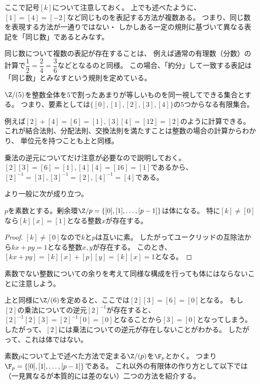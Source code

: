 \documentclass[uplatex]{jsarticle}
\begin{document}
ここで記号$[k]$について注意しておく。
上でも述べたように、$[1]=[4]=[-2]$など同じものを表記する方法が複数ある。
つまり、同じ数を表現する方法が一通りではない・
しかしある一定の規則に基づいて異なる表記を「同じ数」であるとみなす。

同じ数について複数の表記が存在することは、
例えば通常の有理数（分数）の計算で$\dfrac{1}{2}=\dfrac{2}{4}=\dfrac{3}{6}$などとなるのと同様。
この場合、「約分」して一致する表記は「同じ数」とみなすという規則を定めている。

\begin{eg}
  $\Z/(5)$を整数全体を$5$で割ったあまりが等しいものを同一視してできる集合とする。
  つまり、要素としては$\{[0],[1],[2],[3],[4]\}$の$5$つからなる有限集合。

  例えば$[2]+[4]=[6]=[1], [3][4]=[12]=[2]$のように計算できる。
  これが結合法則、分配法則、交換法則を満たすことは整数の場合の計算からわかり、
  単位元を持つことも上と同様。

  乗法の逆元についてだけ注意が必要なので説明しておく。
  $[2][3]=[6]=[1], [4][4]=[16]=[1]$であるから、$[2]^{-1}=[3], [3]^{-1}=[2], [4]^{-1}=[4]$である。
\end{eg}

より一般に次が成り立つ。
\begin{prop}
  $p$を素数とする。剰余環$\Z/p=\{[0],[1],\ldots,[p-1]\}$は体になる。
  特に$[k]\neq[0]$なら$[k][x]=[1]$となる整数$x$が存在する。
\end{prop}

\begin{proof}
  $[k]\neq[0]$なので$k$と$p$は互いに素。
  したがってユークリッドの互除法から$kx+py=1$となる整数$x,y$が存在する。
  このとき、$[kx+py]=[k][x]+[p][y]=[k][x]=1$となる。
\end{proof}

素数でない整数についての余りを考えて同様な構成を行っても体にはならないことに注意しよう。
\begin{eg}
  上と同様に$\Z/(6)$を定めると、ここでは$[2][3]=[6]=[0]$となる。
  もし$[2]$の乗法についての逆元$[2]^{-1}$が存在すると、$[2]^{-1}[2][3]=[2]^{-1}[0]=[0]$となることから$[3]=[0]$となってしまう。
  したがって、$[2]$には乗法についての逆元が存在しないことがわかる。
  したがって、これは体ではない。
\end{eg}

素数$p$について上で述べた方法で定まる$\Z/(p)$を$\F_p$とかく。
つまり$\F_p=\{[0],[1],\ldots,[p-1]\}$である。
これ以外の有限体の作り方として以下では（一見異なるが本質的には差のない）二つの方法を紹介する。
\end{document}
